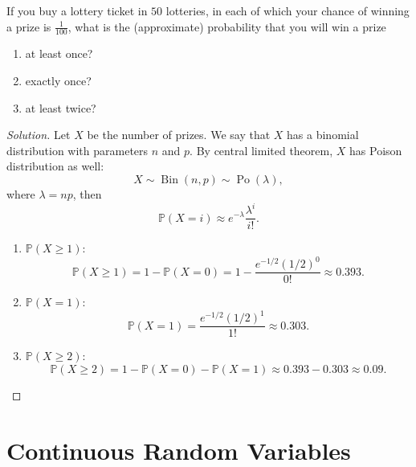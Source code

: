 \documentclass{article}[12pt]
\newenvironment{solution}
  {\renewcommand\qedsymbol{$\blacksquare$}\begin{proof}[Solution]}
  {\end{proof}}
\newenvironment{problem}[1]
  {\renewcommand\theinnercustomprblm{#1}\innercustomprblm}
  {\endinnercustomprblm}
\DeclareMathOperator{\Po}{Po}
\DeclareMathOperator{\Bin}{Bin}
\renewcommand{\P}{\mathbb{P}}
\begin{document}
\begin{problem}{4.59}\normalfont
If you buy a lottery ticket in $50$ lotteries, in each of which your chance of winning a prize is $\tfrac{1}{100}$, what is the (approximate) probability that you will win a prize
\begin{enumerate}[label=(\alph*)]
    \item at least once?
    \item exactly once?
    \item at least twice?
\end{enumerate}
\end{problem}
\begin{solution}
Let $X$ be the number of prizes.
We say that $X$ has a binomial distribution with parameters $n$ and $p$.
By central limited theorem, $X$ has Poison distribution as well:
\begin{equation*}
    X\sim\Bin(n, p)\sim\Po(\lambda),
\end{equation*}
where $\lambda = np$, then
\begin{equation*}
    \P(X = i)\approx e^{-\lambda}\dfrac{\lambda^{i}}{i!}.
\end{equation*}
\begin{enumerate}[label=(\alph*)]
    \item $\P(X \geqslant 1)$:
    \begin{equation*}
        \P(X \geqslant 1) = 1 - \P(X = 0) = 1 - \dfrac{e^{-1/2}(1/2)^{0}}{0!} \approx 0.393.
    \end{equation*}

    \item $\P(X = 1)$:
    \begin{equation*}
        \P(X = 1) = \dfrac{e^{-1/2}(1/2)^{1}}{1!} \approx 0.303.
    \end{equation*}

    \item $\P(X \geqslant 2)$:
    \begin{equation*}
        \P(X \geqslant 2) = 1 - \P(X = 0) - \P(X = 1) \approx 0.393 - 0.303 \approx 0.09.
    \end{equation*}
\end{enumerate}
\end{solution}

\newpage
\section{Continuous Random Variables}
\end{document}
